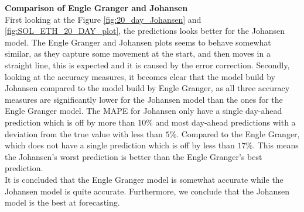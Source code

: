 \noindent \textbf{Comparison of Engle Granger and Johansen}\\

\noindent First looking at the Figure \ref{fig:20_day_Johansen} and \ref{fig:SOL_ETH_20_DAY_plot}, the predictions looks better for the Johansen model. The Engle Granger and Johansen plots seems to behave somewhat similar, as they capture some movement at the start, and then moves in a straight line, this is expected and it is caused by the error correction.
Secondly, looking at the accuracy measures, it becomes clear that the model build by Johansen compared to the model build by Engle Granger, as all three accuracy measures are significantly lower for the Johansen model than the ones for the Engle Granger model. The MAPE for Johansen only have a single day-ahead prediction which is off by more than $10\%$ and most day-ahead predictions with a deviation from the true value with less than $5\%$. Compared to the Engle Granger, which does not have a single prediction which is off by less than $17\%$. This means the Johansen's worst prediction is better than the Engle Granger's best prediction.\\
It is concluded that the Engle Granger model is somewhat accurate while the Johansen model is quite accurate. Furthermore, we conclude that the Johansen model is the best at forecasting.